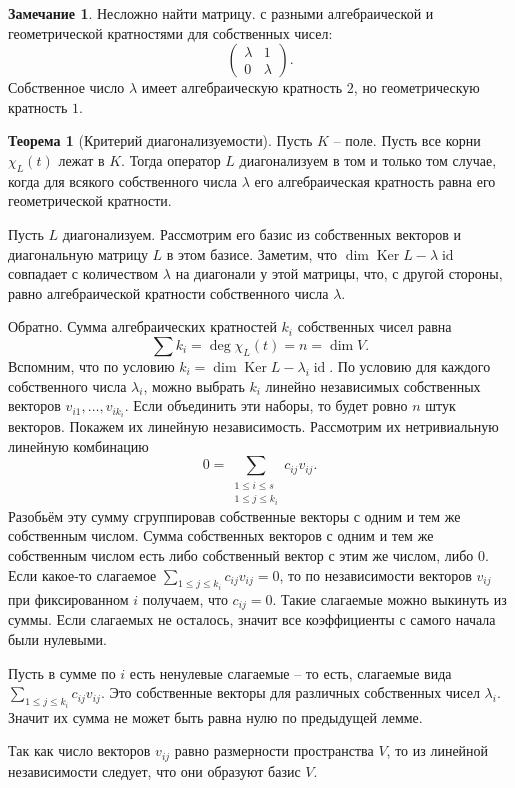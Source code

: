 \documentclass[10pt,a4paper,oneside]{book}
\theoremstyle{definition}
\newtheorem*{rem}{\color{green!50!blue}Замечание}
\newtheorem{thm}{\color{red!40!black}Теорема}
\renewcommand{\leq}{\leqslant}
\newcommand{\id}{\operatorname{id}}
\DeclareMathOperator{\Ker}{Ker}
\def\thrm{\begin{thm}}
\def\ethrm{\end{thm}}
\def\rm{\begin{rem}}
\def\erm{\end{rem}}
\def\pmat{\begin{pmatrix}}
\def\epmat{\end{pmatrix}}
\begin{document}
\rm Несложно найти матрицу. с разными алгебраической и геометрической кратностями для собственных чисел:
$$\pmat \lambda & 1 \\ 0& \lambda \epmat.$$
Собственное число $\lambda$ имеет алгебраическую кратность $2$, но геометрическую кратность $1$.
\erm



\thrm[Критерий диагонализуемости] Пусть $K$ -- поле. Пусть все корни $\chi_L(t)$ лежат в $K$.  Тогда оператор $L$ диагонализуем в том и только том случае, когда для всякого собственного числа $\lambda$ его алгебраическая кратность равна его геометрической кратности.
\ethrm
\proof Пусть $L$ диагонализуем. Рассмотрим его базис из собственных векторов и диагональную матрицу $L$ в этом базисе. Заметим, что $\dim \Ker L- \lambda \id $ совпадает с количеством  $\lambda$ на диагонали у этой матрицы, что, с другой стороны, равно алгебраической кратности собственного числа $\lambda$.

Обратно. Сумма алгебраических кратностей $k_i$ собственных чисел равна $$\sum k_i=\deg \chi_L(t)=n=\dim V.$$
Вспомним, что по условию $k_i=\dim \Ker L - \lambda_i \id$. По условию для каждого собственного числа $\lambda_i$, можно выбрать $k_i$ линейно независимых собственных векторов $v_{i1},\dots,v_{ik_i}$.  Если объединить эти наборы, то будет ровно $n$ штук векторов. Покажем их линейную независимость.
Рассмотрим их нетривиальную линейную комбинацию $$0=\sum_{\substack{1\leq i \leq s \\ 1\leq j\leq k_i}} c_{ij} v_{ij}.$$
Разобьём эту сумму сгруппировав собственные векторы с одним и тем же собственным числом. Сумма собственных векторов с одним и тем же собственным числом есть либо собственный вектор с этим же числом, либо 0. Если какое-то слагаемое $\sum_{1\leq j \leq k_i}c_{ij} v_{ij}=0$, то по независимости векторов $v_{ij}$ при фиксированном $i$ получаем, что $c_{ij}=0$. Такие слагаемые можно выкинуть из суммы. Если слагаемых не осталось, значит все коэффициенты с самого начала были нулевыми. 

Пусть в сумме по $i$ есть ненулевые слагаемые -- то есть, слагаемые вида $\sum_{1\leq j \leq k_i}c_{ij} v_{ij}$.  Это собственные векторы для различных собственных чисел $\lambda_i$. Значит их сумма не может быть равна нулю по предыдущей лемме.

Так как число векторов $v_{ij}$ равно размерности пространства $V$, то  из линейной независимости следует, что они образуют базис $V$.
\endproof
\end{document}
